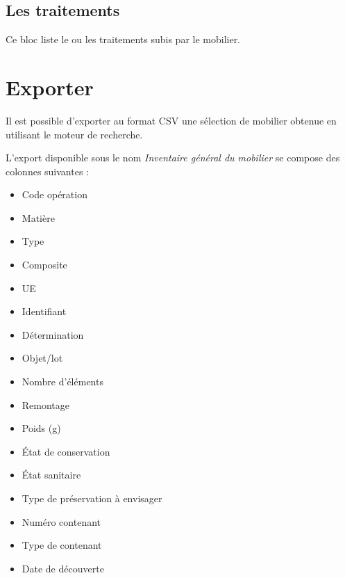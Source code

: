 \documentclass[letterpaper,10pt,french]{sphinxmanual}
\begin{document}
\subsection{Les traitements}
\label{manuel/formulaire_mobilier:les-traitements}
Ce bloc liste le ou les traitements subis par le mobilier.


\section{Exporter}
\label{manuel/formulaire_mobilier:exporter}
Il est possible d'exporter au format CSV une sélection de mobilier obtenue en utilisant le moteur de recherche.

L'export disponible sous le nom \emph{Inventaire général du mobilier} se compose des colonnes suivantes :
\begin{itemize}
\item {} 
Code opération

\item {} 
Matière

\item {} 
Type

\item {} 
Composite

\item {} 
UE

\item {} 
Identifiant

\item {} 
Détermination

\item {} 
Objet/lot

\item {} 
Nombre d'éléments

\item {} 
Remontage

\item {} 
Poids (g)

\item {} 
État de conservation

\item {} 
État sanitaire

\item {} 
Type de préservation à envisager

\item {} 
Numéro contenant

\item {} 
Type de contenant

\item {} 
Date de découverte


\end{itemize}
\end{document}
